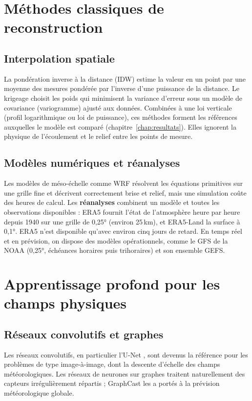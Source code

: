 \section{Méthodes classiques de reconstruction}

\subsection{Interpolation spatiale}
La pondération inverse à la distance (IDW) \citep{shepard1968} estime la valeur en un point par
une moyenne des mesures pondérée par l'inverse d'une puissance de la distance. Le krigeage
\citep{cressie1993} choisit les poids qui minimisent la variance d'erreur sous un modèle de
covariance (variogramme) ajusté aux données. Combinées à une loi verticale (profil logarithmique
ou loi de puissance), ces méthodes forment les références auxquelles le modèle est comparé
(chapitre~\ref{chap:resultats}). Elles ignorent la physique de l'écoulement et le relief entre les
points de mesure.

\subsection{Modèles numériques et réanalyses}
Les modèles de méso-échelle comme WRF \citep{skamarock2019} résolvent les équations primitives sur
une grille fine et décrivent correctement brise et relief, mais une simulation coûte des heures de
calcul. Les \textbf{réanalyses} combinent un modèle et toutes les observations disponibles :
ERA5 \citep{hersbach2020} fournit l'état de l'atmosphère heure par heure depuis 1940 sur une
grille de 0,25° (environ 25\,km), et ERA5-Land \citep{munozsabater2021} la surface à 0,1°. ERA5
n'est disponible qu'avec environ cinq jours de retard. En temps réel et en prévision, on dispose
des modèles opérationnels, comme le GFS de la NOAA (0,25°, échéances horaires puis triho\-raires) et
son ensemble GEFS.

\section{Apprentissage profond pour les champs physiques}

\subsection{Réseaux convolutifs et graphes}
Les réseaux convolutifs, en particulier l'U-Net \citep{ronneberger2015}, sont devenus la référence
pour les problèmes de type image-à-image, dont la descente d'échelle des champs météorologiques.
Les réseaux de neurones sur graphes traitent naturellement des capteurs irrégulièrement répartis ;
GraphCast \citep{lam2023} les a portés à la prévision météorologique globale.

